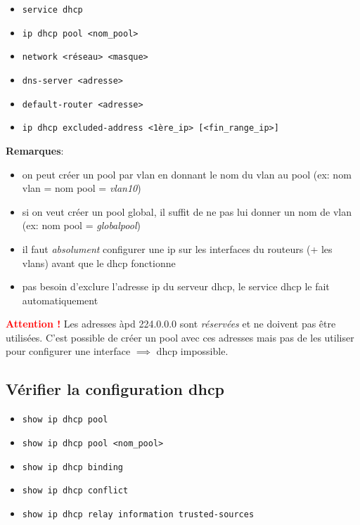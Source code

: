 \documentclass[a4paper]{article}
\begin{document}
\begin{itemize}[label=\textbf{–}]
    \item \texttt{service dhcp}
    \item \texttt{ip dhcp pool <nom\_pool>}
    \item \texttt{network <réseau> <masque>}
    \item \texttt{dns-server <adresse>}
    \item \texttt{default-router <adresse>}
    \item \texttt{ip dhcp excluded-address <1ère\_ip> [<fin\_range\_ip>]}
\end{itemize}
\textbf{Remarques}:
\begin{itemize}
    \item on peut créer un pool par vlan en donnant le nom du vlan au pool (ex: nom vlan = nom pool = \textit{vlan10})
    \item si on veut créer un pool global, il suffit de ne pas lui donner un nom de vlan (ex: nom pool = \textit{globalpool})
    \item il faut \textit{absolument} configurer une ip sur les interfaces du routeurs (+ les vlans) avant que le dhcp fonctionne
    \item pas besoin d'exclure l'adresse ip du serveur dhcp, le service dhcp le fait automatiquement
\end{itemize}
\textcolor{red}{\textbf{Attention !}} Les adresses àpd 224.0.0.0 sont \textit{réservées} et ne doivent pas être utilisées. C'est possible de créer un pool avec ces adresses mais pas de les utiliser pour configurer une interface $ \implies $ dhcp impossible.





\subsection{Vérifier la configuration dhcp}



\begin{itemize}[label=\textbf{–}]
    \item \texttt{show ip dhcp pool}
    \item \texttt{show ip dhcp pool <nom\_pool>}
    \item \texttt{show ip dhcp binding}
    \item \texttt{show ip dhcp conflict}
    \item \texttt{show ip dhcp relay information trusted-sources}
\end{itemize}
\end{document}
